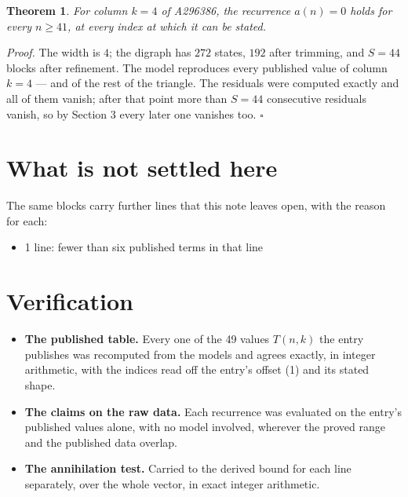 \documentclass[11pt]{article}
\newtheorem{theorem}{Theorem}
\theoremstyle{definition}
\begin{document}
\begin{theorem} For column $k = 4$ of A296386, the recurrence $a(n) = 0$ holds for every $n \ge 41$, at every index at which it can be stated.\end{theorem}

{\itshape Proof.} The width is $4$; the digraph has $272$ states, $192$ after trimming, and $S = 44$ blocks after refinement. The model reproduces every published value of column $k = 4$ --- and of the rest of the triangle. The residuals were computed exactly and all of them vanish; after that point more than $S = 44$ consecutive residuals vanish, so by Section 3 every later one vanishes too. $\square$

\section{What is not settled here}

The same blocks carry further lines that this note leaves open, with the reason for each:

\begin{itemize}

\item 1 line: fewer than six published terms in that line

\end{itemize}

\section{Verification}

\begin{itemize}

\item {\bfseries The published table.} Every one of the 49 values $T(n,k)$ the entry publishes was recomputed from the models and agrees exactly, in integer arithmetic, with the indices read off the entry's offset (1) and its stated shape.

\item {\bfseries The claims on the raw data.} Each recurrence was evaluated on the entry's published values alone, with no model involved, wherever the proved range and the published data overlap.

\item {\bfseries The annihilation test.} Carried to the derived bound for each line separately, over the whole vector, in exact integer arithmetic.

\end{itemize}
\end{document}
